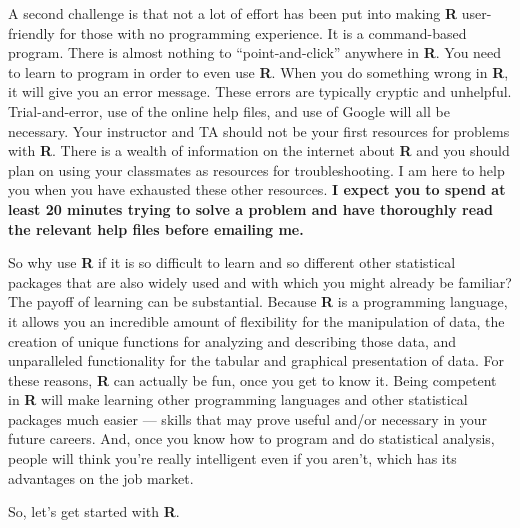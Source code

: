 \documentclass[12pt]{article}\usepackage[]{graphicx}\usepackage[]{color}
\begin{document}
A second challenge is that not a lot of effort has been put into making \textbf{R} user-friendly for those with no programming experience. It is a command-based program. There is almost nothing to ``point-and-click'' anywhere in \textbf{R}. You need to learn to program in order to even use \textbf{R}. When you do something wrong in \textbf{R}, it will give you an error message. These errors are typically cryptic and unhelpful. Trial-and-error, use of the online help files, and use of Google will all be necessary. Your instructor and TA should not be your first resources for problems with \textbf{R}. There is a wealth of information on the internet about \textbf{R} and you should plan on using your classmates as resources for troubleshooting. I am here to help you when you have exhausted these other resources. \textbf{I expect you to spend at least 20 minutes trying to solve a problem and have thoroughly read the relevant help files before emailing me.}

So why use \textbf{R} if it is so difficult to learn and so different other statistical packages that are also widely used and with which you might already be familiar? The payoff of learning can be substantial. Because \textbf{R} is a programming language, it allows you an incredible amount of flexibility for the manipulation of data, the creation of unique functions for analyzing and describing those data, and unparalleled functionality for the tabular and graphical presentation of data. For these reasons, \textbf{R} can actually be fun, once you get to know it. Being competent in \textbf{R} will make learning other programming languages and other statistical packages much easier --- skills that may prove useful and/or necessary in your future careers. And, once you know how to program and do statistical analysis, people will think you're really intelligent even if you aren't, which has its advantages on the job market.

So, let's get started with \textbf{R}.
\end{document}
